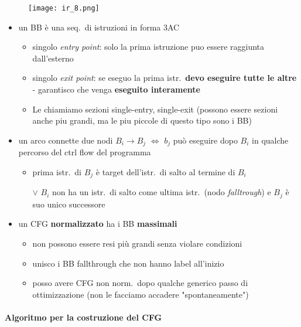 {%
  \begin{wrapfigure}{r}{.325\textwidth}
		\vspace{5em}
    \hfill\texttt{[image: ir\_8.png]}
  \end{wrapfigure}
	\noindent\par \begin{itemize}
		\item un BB \`e una seq.~di istruzioni in forma 3AC
			\begin{itemize}
				\item singolo \textit{entry point}: solo la prima istruzione puo essere raggiunta dall'esterno
				\item singolo \textit{exit point}: se eseguo la prima istr.~\textbf{devo eseguire tutte le altre} - garantisco che venga \textbf{eseguito interamente}
				\item Le chiamiamo sezioni single-entry, single-exit (possono essere sezioni anche piu grandi, ma le piu piccole di questo tipo sono i BB)
			\end{itemize}
		\item un arco connette due nodi $B_{i}\rightarrow B_{j}$ $\iff$ $b_{j}$ pu\`o eseguire dopo $B_{i}$ in qualche percorso del ctrl flow del programma
			\begin{itemize}
				\item prima istr.~di $B_{j}$ \`e target dell'istr.~di salto al termine di $B_{i}$
				\item[$\lor$] $B_{i}$ non ha un istr.~di salto come ultima istr.~(nodo \textit{falltrough}) e $B_{j}$ \`e suo unico successore
			\end{itemize}
		\item un CFG \textbf{normalizzato} ha i BB \textbf{massimali}
			\begin{itemize}
				\item non possono essere resi pi\`u grandi senza violare condizioni
				\item unisco i BB fallthrough che non hanno label all'inizio
				\item posso avere CFG non norm.~dopo qualche generico passo di ottimizzazione (non le facciamo accadere "spontaneamente")
			\end{itemize}
	\end{itemize}%
}


\paragraph{Algoritmo per la costruzione del CFG}~\\

